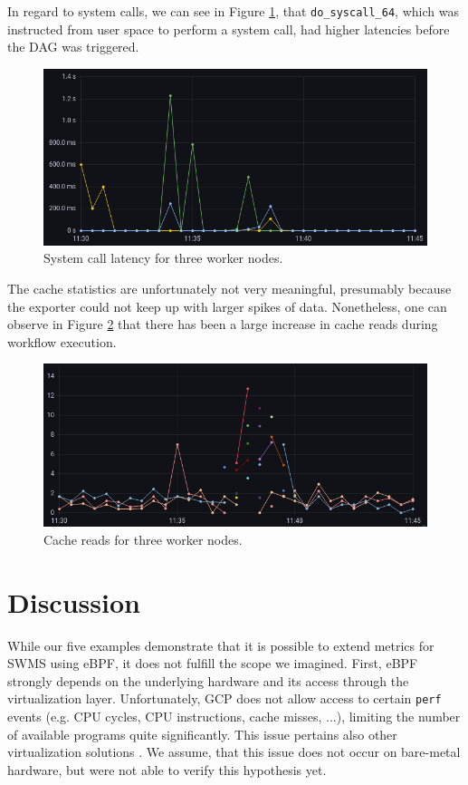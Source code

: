\documentclass[a4paper,journal]{IEEEtran}
\begin{document}
	In regard to system calls, we can see in Figure \ref{fig:results:syscalls}, that \texttt{do\_syscall\_64}, which was instructed from user space to perform a system call, had higher latencies before the DAG was triggered.
	\begin{figure}[h]
		\includegraphics[width=\linewidth]{images/results_syscalls_total.png}
		\caption{System call latency for three worker nodes.}
		\label{fig:results:syscalls}
	\end{figure}
	
	The cache statistics are unfortunately not very meaningful, presumably because the exporter could not keep up with larger spikes of data. Nonetheless, one can observe in Figure \ref{fig:results:cachestat} that there has been a large increase in cache reads during workflow execution.
	\begin{figure}[h]
		\includegraphics[width=\linewidth]{images/results_cachestat_access.png}
		\caption{Cache reads for three worker nodes.}
		\label{fig:results:cachestat}
	\end{figure}
	
	\section{Discussion}
	While our five examples demonstrate that it is possible to extend metrics for SWMS using eBPF, it does not fulfill the scope we imagined.
	First, eBPF strongly depends on the underlying hardware and its access through the virtualization layer. Unfortunately, GCP does not allow access to certain \texttt{perf} events (e.g. CPU cycles, CPU instructions, cache misses, ...), limiting the number of available programs quite significantly. This issue pertains also other virtualization solutions \cite{ebpfVirtIssue1}\cite{ebpfVirtIssue2}\cite{ebpfVirtIssue3}. We assume, that this issue does not occur on bare-metal hardware, but were not able to verify this hypothesis yet.
	
\end{document}
